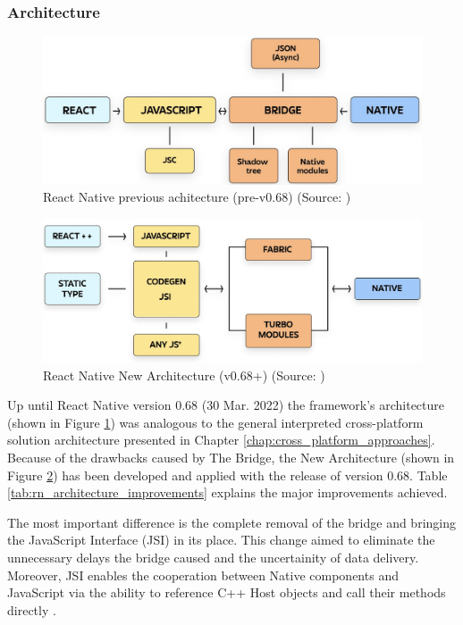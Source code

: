 \subsubsection*{Architecture}

\begin{figure}[h]
	\centering
	\includegraphics[width=.77\textwidth]{img/rn_old_architecture}
	\caption{React Native previous achitecture (pre-v0.68) (Source: \cite{matijevic_rn_rearchitecture})}
	\label{fig:rn_old_architecture}
\end{figure}

\begin{figure}[h]
	\centering
	\includegraphics[width=.77\textwidth]{img/rn_new_architecture}
	\caption{React Native New Architecture (v0.68+) (Source: \cite{matijevic_rn_rearchitecture})}
	\label{fig:rn_new_architecture}
\end{figure}

Up until React Native version 0.68 (30 Mar. 2022) the framework's architecture (shown in Figure \ref{fig:rn_old_architecture}) was analogous to the general interpreted cross-platform solution architecture presented in Chapter \ref{chap:cross_platform_approaches}. Because of the drawbacks caused by The Bridge, the New Architecture (shown in Figure \ref{fig:rn_new_architecture}) has been developed and applied with the release of version 0.68. Table \ref{tab:rn_architecture_improvements} explains the major improvements achieved.

The most important difference is the complete removal of the bridge and bringing the JavaScript Interface (JSI) in its place. This change aimed to eliminate the unnecessary delays the bridge caused and the uncertainity of data delivery. Moreover, JSI enables the cooperation between Native components and JavaScript via the ability to reference C++ Host objects and call their methods directly \cite{matijevic_rn_rearchitecture}.

